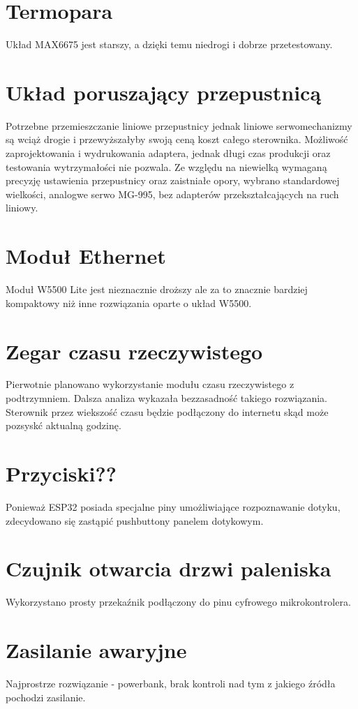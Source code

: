 \documentclass[12pt]{report}
\begin{document}
 \section{Termopara}
 Układ MAX6675 jest starszy, a dzięki temu niedrogi i dobrze przetestowany. 

 \section{Układ poruszający przepustnicą} 
 Potrzebne przemieszczanie liniowe przepustnicy jednak liniowe serwomechanizmy są wciąż drogie i przewyższałyby swoją ceną koszt całego sterownika.
 Możliwość zaprojektowania i wydrukowania adaptera, jednak długi czas produkcji oraz testowania wytrzymałości nie pozwala.
  Ze względu na niewielką wymaganą precyzję ustawienia przepustnicy oraz zaistniałe opory, wybrano standardowej wielkości, analogwe serwo MG-995, bez adapterów przekształcających na ruch liniowy.
 
 \section{Moduł Ethernet}
 Moduł W5500 Lite jest nieznacznie droższy ale za to znacznie bardziej kompaktowy niż inne rozwiązania oparte o układ W5500.
 
 \section{Zegar czasu rzeczywistego}
 Pierwotnie planowano wykorzystanie modułu czasu rzeczywistego z podtrzymniem. Dalsza analiza wykazała bezzasadność takiego rozwiązania. Sterownik przez wiekszość czasu będzie podłączony do internetu skąd może pozsyskć aktualną godzinę.
 
 \section{Przyciski??}
 Ponieważ ESP32 posiada specjalne piny umożliwiające rozpoznawanie dotyku, zdecydowano się zastąpić pushbuttony panelem dotykowym.
 
 \section{Czujnik otwarcia drzwi paleniska}
 Wykorzystano prosty przekaźnik podłączony do pinu cyfrowego mikrokontrolera.
 
 \section{Zasilanie awaryjne}
 Najprostrze rozwiązanie - powerbank, brak kontroli nad tym z jakiego źródła pochodzi zasilanie.
\end{document}
